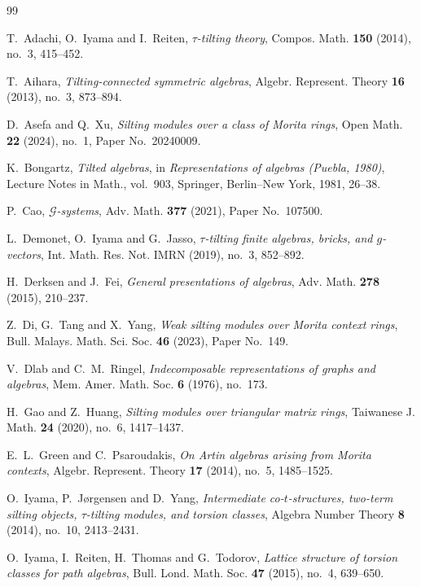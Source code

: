 \documentclass[11pt,reqno]{amsart}
\theoremstyle{definition}
\theoremstyle{remark}
\numberwithin{equation}{section}
\begin{document}
\begin{thebibliography}{99}
\footnotesize

T.~Adachi, O.~Iyama and I.~Reiten,
\emph{$\tau$-tilting theory},
Compos. Math. \textbf{150} (2014), no.~3, 415--452.

T.~Aihara,
\emph{Tilting-connected symmetric algebras},
Algebr. Represent. Theory \textbf{16} (2013), no.~3, 873--894.

D.~Asefa and Q.~Xu,
\emph{Silting modules over a class of Morita rings},
Open Math. \textbf{22} (2024), no.~1, Paper No.~20240009.

K.~Bongartz,
\emph{Tilted algebras},
in \emph{Representations of algebras (Puebla, 1980)}, Lecture Notes in
Math., vol.~903, Springer, Berlin--New York, 1981, 26--38.

P.~Cao,
\emph{$\mathcal G$-systems},
Adv. Math. \textbf{377} (2021), Paper No.~107500.

L.~Demonet, O.~Iyama and G.~Jasso,
\emph{$\tau$-tilting finite algebras, bricks, and $g$-vectors},
Int. Math. Res. Not. IMRN (2019), no.~3, 852--892.

H.~Derksen and J.~Fei,
\emph{General presentations of algebras},
Adv. Math. \textbf{278} (2015), 210--237.

Z.~Di, G.~Tang and X.~Yang,
\emph{Weak silting modules over Morita context rings},
Bull. Malays. Math. Sci. Soc. \textbf{46} (2023), Paper No.~149.

V.~Dlab and C.~M.~Ringel,
\emph{Indecomposable representations of graphs and algebras},
Mem. Amer. Math. Soc. \textbf{6} (1976), no.~173.

H.~Gao and Z.~Huang,
\emph{Silting modules over triangular matrix rings},
Taiwanese J. Math. \textbf{24} (2020), no.~6, 1417--1437.

E.~L.~Green and C.~Psaroudakis,
\emph{On Artin algebras arising from Morita contexts},
Algebr. Represent. Theory \textbf{17} (2014), no.~5, 1485--1525.

O.~Iyama, P.~J{\o}rgensen and D.~Yang,
\emph{Intermediate co-$t$-structures, two-term silting objects,
$\tau$-tilting modules, and torsion classes},
Algebra Number Theory \textbf{8} (2014), no.~10, 2413--2431.

O.~Iyama, I.~Reiten, H.~Thomas and G.~Todorov,
\emph{Lattice structure of torsion classes for path algebras},
Bull. Lond. Math. Soc. \textbf{47} (2015), no.~4, 639--650.


\end{thebibliography}
\end{document}
